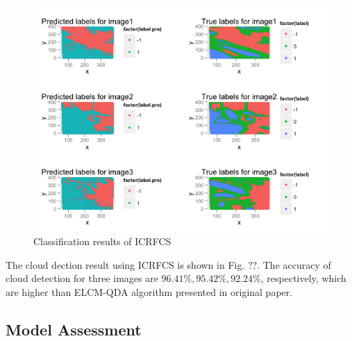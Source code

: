 \documentclass[english]{article}\usepackage{graphicx, color}
\numberwithin{equation}{section}
\numberwithin{figure}{section}
\begin{document}
\begin{figure}[!h]
  \begin{center}
    \includegraphics[width=\columnwidth]{figures/CRF.png}
  \end{center}
  \caption{Classification results of ICRFCS}
  \label{fig:ICRFCS}
\end{figure}

The cloud dection result using ICRFCS is shown in Fig. ??. The accuracy of cloud detection for three images are $96.41\%, 95.42\%, 92.24\%$, respectively, which are higher than ELCM-QDA algorithm presented in original paper.

\subsection{Model Assessment}
\end{document}
